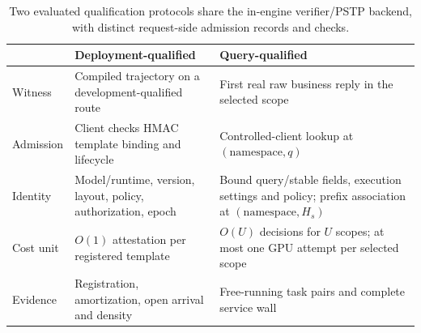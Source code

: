 \begin{table}[t]
\centering\footnotesize
\setlength{\tabcolsep}{3pt}
\caption{Two evaluated qualification protocols share the in-engine verifier/PSTP backend, with distinct request-side admission records and checks.}
\label{tab:qualification-protocols}
\begin{tabular}{@{}P{.58in}P{1.25in}P{1.32in}@{}}
\toprule
& Deployment-qualified & Query-qualified\\
\midrule
Witness & Compiled trajectory on a development-qualified route & First real raw business reply in the selected scope\\
Admission & Client checks HMAC template binding and lifecycle & Controlled-client lookup at $(\mathrm{namespace},q)$\\
Identity & Model/runtime, version, layout, policy, authorization, epoch & Bound query/stable fields, execution settings and policy; prefix association at $(\mathrm{namespace},H_s)$\\
Cost unit & $O(1)$ attestation per registered template & $O(U)$ decisions for $U$ scopes; at most one GPU attempt per selected scope\\
Evidence & Registration, amortization, open arrival and density & Free-running task pairs and complete service wall\\
\bottomrule
\end{tabular}
\end{table}
